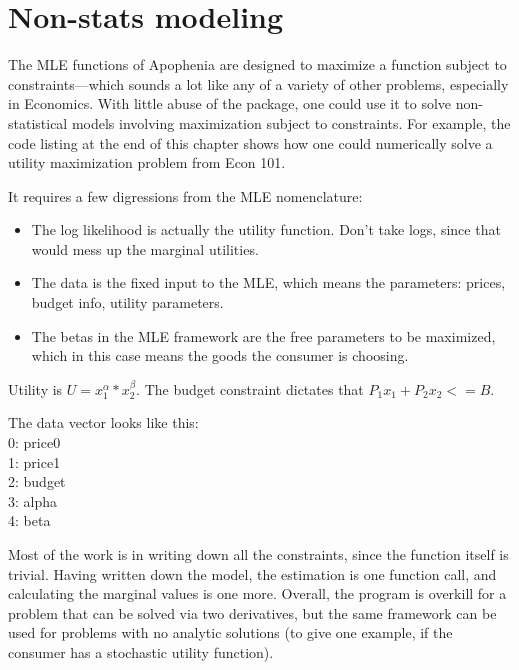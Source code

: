 \section{Non-stats modeling}    \label{econ101}

The MLE functions of Apophenia are designed to maximize a function
subject to constraints---which sounds a lot like any of a variety of
other problems, especially in Economics. With little abuse of the package,
one could use it to solve non-statistical models involving maximization
subject to constraints. For example, the code listing at the end of this
chapter shows how one could numerically solve a utility maximization
problem from Econ 101. 

It requires a few digressions from the MLE nomenclature:
\begin{itemize}
\item The log likelihood is actually the utility function. Don't take logs,
since that would mess up the marginal utilities.

\item The data is the fixed input to the MLE, which means the parameters:
prices, budget info, utility parameters.

\item The betas in the MLE framework are the free parameters to be
maximized, which in this case means the goods the consumer is choosing.
\end{itemize}

Utility is $U = x_1^\alpha * x_2^\beta$. 
The budget constraint dictates that $P_1 x_1 + P_2 x_2 <= B$.
                                                             
The data vector looks like this:\\
0:  price0\\
1:  price1\\
2:  budget \\
3:  alpha  \\
4:  beta   
                                                             
Most of the work is in writing down all the constraints, since the
function itself is trivial. Having written down the model, the estimation
is one function call, and calculating the marginal values is one more.
Overall, the program is overkill for a problem that can be solved via
two derivatives, but the same framework can be used for problems with no
analytic solutions (to give one example, if the consumer has a stochastic
utility function).

